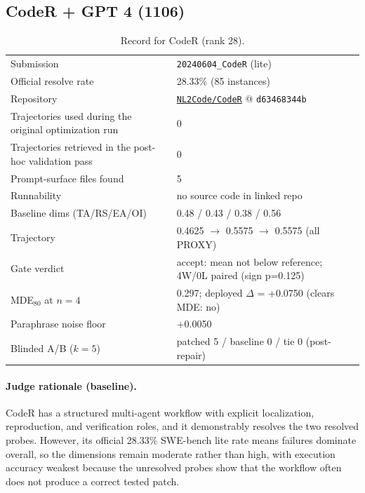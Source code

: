 \subsection{CodeR + GPT 4 (1106)}
\label{app:agent28}
\begin{table}[h]\centering\scriptsize
\caption{Record for CodeR (rank 28).}
\begin{tabular}{lp{8.2cm}}\toprule
Submission & \texttt{20240604\_\allowbreak{}CodeR} (lite) \\
Official resolve rate & 28.33\% (85 instances) \\
Repository & \href{https://github.com/NL2Code/CodeR}{\texttt{NL2Code/CodeR}} @ \texttt{d63468344b} \\
Trajectories used during the original optimization run & 0 \\
Trajectories retrieved in the post-hoc validation pass & 0 \\
Prompt-surface files found & 5 \\
Runnability & no source code in linked repo \\
Baseline dims (TA/RS/EA/OI) & 0.48 / 0.43 / 0.38 / 0.56 \\
Trajectory & 0.4625 $\to$ 0.5575 $\to$ 0.5575 (all PROXY) \\
Gate verdict & accept: mean not below reference; 4W/0L paired (sign p=0.125) \\
MDE$_{80}$ at $n{=}4$ & 0.297; deployed $\Delta$ = +0.0750 (clears MDE: no) \\
Paraphrase noise floor & +0.0050 \\
Blinded A/B ($k{=}5$) & patched 5 / baseline 0 / tie 0 (post-repair) \\
\bottomrule\end{tabular}\end{table}
\paragraph{Judge rationale (baseline).}
CodeR has a structured multi-agent workflow with explicit localization, reproduction, and verification roles, and it demonstrably resolves the two resolved probes. However, its official 28.33\% SWE-bench lite rate means failures dominate overall, so the dimensions remain moderate rather than high, with execution accuracy weakest because the unresolved probes show that the workflow often does not produce a correct tested patch.
